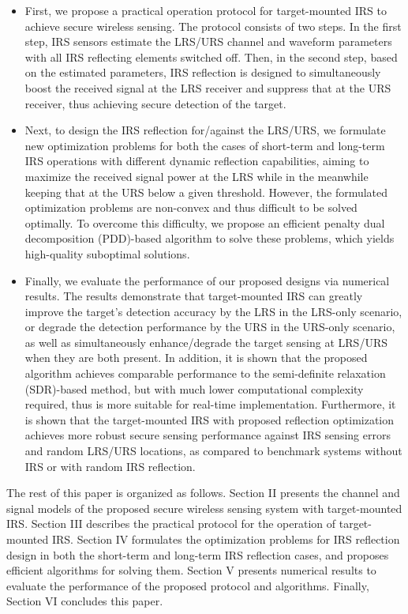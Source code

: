 \documentclass[10pt,final,doublecolumn]{IEEEtran}
\begin{document}
\begin{itemize}
\item
First, we propose a practical operation protocol for target-mounted IRS to achieve secure wireless sensing. The protocol consists of two steps. In the first step, IRS sensors estimate the LRS/URS channel and waveform parameters with all IRS reflecting elements switched off. Then, in the second step, based on the estimated parameters, IRS reflection is designed to simultaneously boost the received signal at the LRS receiver and suppress that at the URS receiver, thus achieving secure detection of the target.

\item
Next, to design the IRS reflection for/against the LRS/URS, we formulate new optimization problems for both the cases of short-term and long-term IRS operations with different dynamic reflection capabilities, aiming to maximize the received signal power at the LRS while in the meanwhile keeping that at the URS below a given threshold. However, the formulated optimization problems are non-convex and thus difficult to be solved optimally. To overcome this difficulty, we propose an efficient penalty dual decomposition (PDD)-based algorithm to solve these problems, which yields high-quality suboptimal solutions.

\item
Finally, we evaluate the performance of our proposed
designs via numerical results. The results demonstrate that target-mounted IRS can greatly improve the target's detection accuracy by the LRS in the LRS-only scenario, or degrade the detection performance by the URS in the URS-only scenario, as well as simultaneously enhance/degrade the target sensing at LRS/URS when they are both present. In addition, it is shown that the proposed algorithm achieves comparable performance to the semi-definite relaxation (SDR)-based method, but with much lower computational complexity required, thus is more suitable for real-time implementation. Furthermore, it is shown that the target-mounted IRS with proposed reflection optimization achieves more robust secure sensing performance against IRS sensing errors and random LRS/URS locations, as compared to benchmark systems without IRS or with random IRS reflection.
\end{itemize}

The rest of this paper is organized as follows. Section II
presents the channel and signal models of the proposed secure wireless sensing system with target-mounted IRS. Section III describes the  practical protocol for the operation of target-mounted IRS.
Section IV formulates
the optimization problems for IRS reflection design in both the short-term and long-term IRS reflection cases, and proposes efficient algorithms for solving them. Section V presents numerical results to evaluate
the performance of the proposed protocol and algorithms. Finally,
Section VI concludes this paper.
\end{document}
